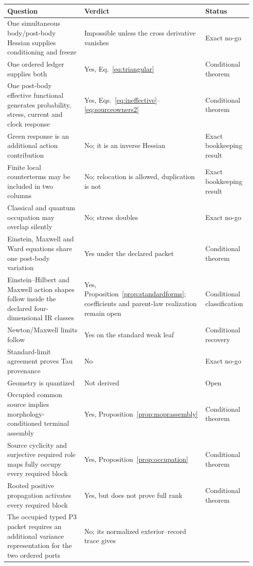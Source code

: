 \documentclass[11pt]{article}
\begin{document}
\begin{longtable}{@{}p{}p{}p{}@{}}
\toprule
Question & Verdict & Status\\
\midrule
One simultaneous body/post-body Hessian supplies conditioning and freeze &
Impossible unless the cross derivative vanishes & Exact no-go\\
One ordered ledger supplies both & Yes, Eq.~\eqref{eq:triangular} & Conditional theorem\\
One post-body effective functional generates probability, stress, current
and clock response & Yes, Eqs.~\eqref{eq:ineffective}--\eqref{eq:sourceowners2}
& Conditional theorem\\
Green response is an additional action contribution & No; it is an inverse
Hessian & Exact bookkeeping result\\
Finite local counterterms may be included in two columns & No; relocation is
allowed, duplication is not & Exact bookkeeping result\\
Classical and quantum occupation may overlap silently & No; stress doubles & Exact no-go\\
Einstein, Maxwell and Ward equations share one post-body variation & Yes under the declared packet & Conditional theorem\\
Einstein--Hilbert and Maxwell action shapes follow inside the declared
four-dimensional IR classes & Yes, Proposition~\ref{prop:standardforms};
coefficients and parent-law realization remain open & Conditional classification\\
Newton/Maxwell limits follow & Yes on the standard weak leaf & Conditional recovery\\
Standard-limit agreement proves Tau provenance & No & Exact no-go\\
Geometry is quantized & Not derived & Open\\
Occupied common source implies morphology-conditioned terminal assembly &
Yes, Proposition~\ref{prop:moprassembly} & Conditional theorem\\
Source cyclicity and surjective required role maps fully occupy every required
block & Yes,
Proposition~\ref{prop:occupation} & Conditional theorem\\
Rooted positive propagation activates every required block & Yes, but does
not prove full rank & Conditional theorem\\
The occupied typed P3 packet requires an additional variance representation
for the two ordered ports & No; its normalized exterior--record trace gives

\end{longtable}
\end{document}
